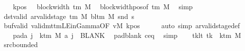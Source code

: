 \begin{isabellebody}
\ \ \isamarkupfalse%
\ kpos{\isacharcolon}{\kern0pt}\ {\isachardoublequoteopen}{}\ {\isacharless}{\kern0pt}\ block{\isacharunderscore}{\kern0pt}width\ {\isacharparenleft}{\kern0pt}{\isasymGamma}{\isacharunderscore}{\kern0pt}tm\ M{\isacharparenright}{\kern0pt}{\isachardoublequoteclose}\ \isamarkupfalse%
\ block{\isacharunderscore}{\kern0pt}width{\isacharunderscore}{\kern0pt}pos{\isacharbrackleft}{\kern0pt}of\ {\isachardoublequoteopen}{\isasymGamma}{\isacharunderscore}{\kern0pt}tm\ M{\isachardoublequoteclose}{\isacharbrackright}{\kern0pt}\ \isamarkupfalse%
\ simp\isanewline
\ \ \isamarkupfalse%
\ dst{\isacharunderscore}{\kern0pt}valid{\isacharcolon}{\kern0pt}\ {\isachardoublequoteopen}ar{\isacharunderscore}{\kern0pt}valid{\isacharunderscore}{\kern0pt}stage\ {\isacharparenleft}{\kern0pt}{\isasymGamma}{\isacharunderscore}{\kern0pt}tm\ M{\isacharparenright}{\kern0pt}\ {\isacharparenleft}{\kern0pt}bl{\isacharunderscore}{\kern0pt}tm\ M{\isacharparenright}{\kern0pt}\ {\isacharparenleft}{\kern0pt}snd\ {\isacharquery}{\kern0pt}s{\isacharprime}{\kern0pt}{\isacharparenright}{\kern0pt}{\isachardoublequoteclose}\isanewline
\ \ \ \ \isamarkupfalse%
\ buf{\isacharunderscore}{\kern0pt}valid\ valid{\isacharunderscore}{\kern0pt}mttm{\isacharunderscore}{\kern0pt}LE{\isacharunderscore}{\kern0pt}in{\isacharunderscore}{\kern0pt}Gamma{\isacharbrackleft}{\kern0pt}OF\ vM{\isacharbrackright}{\kern0pt}\ kpos\isanewline
\ \ \ \ \isamarkupfalse%
\ {\isacharparenleft}{\kern0pt}auto\ simp{\isacharcolon}{\kern0pt}\ ar{\isacharunderscore}{\kern0pt}valid{\isacharunderscore}{\kern0pt}stage{\isacharunderscore}{\kern0pt}def{\isacharparenright}{\kern0pt}\isanewline
\ \ \isamarkupfalse%
\ pad{\isacharunderscore}{\kern0pt}a{\isacharcolon}{\kern0pt}\ {\isachardoublequoteopen}{\isasymforall}j\ {\isasymge}\ k{\isacharunderscore}{\kern0pt}tm\ M{\isachardot}{\kern0pt}\ {\isacharquery}{\kern0pt}a\ j\ {\isacharequal}{\kern0pt}\ BLANK{}{\isachardoublequoteclose}\ \isamarkupfalse%
\ pad{\isacharunderscore}{\kern0pt}blank\ c{\isacharprime}{\kern0pt}{\isacharunderscore}{\kern0pt}eq\ \isamarkupfalse%
\ simp\isanewline
\ \ \isamarkupfalse%
\ tk{\isacharunderscore}{\kern0pt}lt{\isacharcolon}{\kern0pt}\ {\isachardoublequoteopen}tk\ {\isacharless}{\kern0pt}\ k{\isacharunderscore}{\kern0pt}tm\ M{\isachardoublequoteclose}\ \isamarkupfalse%
\ src{\isacharunderscore}{\kern0pt}bounded\ \isamarkupfalse%

\end{isabellebody}
